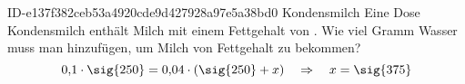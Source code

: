 \begin{exercise}
      {ID-e137f382ceb53a4920cde9d427928a97e5a38bd0}
      {Kondensmilch}
  \ifproblem\problem
    Eine Dose Kondensmilch enthält  Milch mit einem Fettgehalt von
    . Wie viel Gramm Wasser muss man hinzufügen, um Milch von 
    Fettgehalt zu bekommen?
  \fi
  \ifoutcome\outcome
    \begin{equation*}
      0,\!1\cdot\text{\sig{250}}=0,\!04\cdot(\text{\sig{250}}+x)
      \quad\Rightarrow\quad
      x=\text{\sig{375}}
    \end{equation*}
  \fi
\end{exercise}
